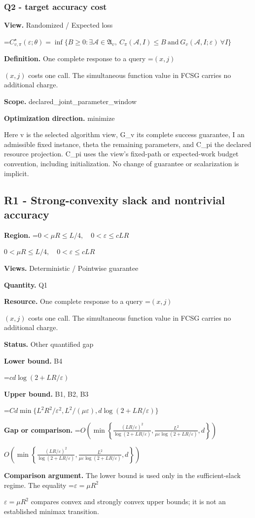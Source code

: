 \documentclass[10pt,a4paper]{article}
\newcommand{\AtlasMath}[1]{\par\begingroup\centering\setbox0=\hbox{$\displaystyle #1$}\ifdim\wd0>1.4\linewidth\typeout{ATLAS WIDE FORMULA: \the\wd0}\fi\ifdim\wd0>\linewidth\resizebox{\linewidth}{!}{\box0}\else\box0\fi\par\endgroup}
\newcommand{\AtlasInlineMath}[1]{\begingroup\setbox0=\hbox{$#1$}\ifdim\wd0>.4\linewidth\endgroup\AtlasMath{#1}\else\endgroup$#1$\fi}
\begin{document}
\subsubsection{Q2 - target accuracy cost}
\textbf{View.} Randomized / Expected loss

\AtlasMath{C^\star_{v,\pi}(\varepsilon;\theta)=\inf\{B\ge0:\exists\mathcal A\in\mathfrak A_v,\ C_\pi(\mathcal A,I)\le B\ \text{and}\ G_v(\mathcal A,I;\varepsilon)\ \forall I\}}
\textbf{Definition.} One complete response to a query \AtlasInlineMath{(x,j)} costs one call. The simultaneous function value in FCSG carries no additional charge.

\textbf{Scope.} declared\_joint\_parameter\_window

\textbf{Optimization direction.} minimize

Here v is the selected algorithm view, G\_v its complete success guarantee, I an admissible fixed instance, theta the remaining parameters, and C\_pi the declared resource projection. C\_pi uses the view's fixed-path or expected-work budget convention, including initialization. No change of guarantee or scalarization is implicit.

\subsection{R1 - Strong-convexity slack and nontrivial accuracy}
\textbf{Region.} \AtlasInlineMath{0<\mu R\le L/4,\quad0<\varepsilon\le cLR}

\textbf{Views.} Deterministic / Pointwise guarantee

\textbf{Quantity.} Q1

\textbf{Resource.} One complete response to a query \AtlasInlineMath{(x,j)} costs one call. The simultaneous function value in FCSG carries no additional charge.

\textbf{Status.} Other quantified gap

\textbf{Lower bound.} B4

\AtlasMath{cd\log(2+LR/\varepsilon)}
\textbf{Upper bound.} B1, B2, B3

\AtlasMath{Cd\min\{L^2R^2/\varepsilon^2,L^2/(\mu\varepsilon),d\log(2+LR/\varepsilon)\}}
\textbf{Gap or comparison.} \AtlasInlineMath{O\!\left(\min\left\{\frac{(LR/\varepsilon)^2}{\log(2+LR/\varepsilon)},\frac{L^2}{\mu\varepsilon\log(2+LR/\varepsilon)},d\right\}\right)}

\textbf{Comparison argument.} The lower bound is used only in the sufficient-slack regime. The equality \AtlasInlineMath{\varepsilon=\mu R^2} compares convex and strongly convex upper bounds; it is not an established minimax transition.
\end{document}

